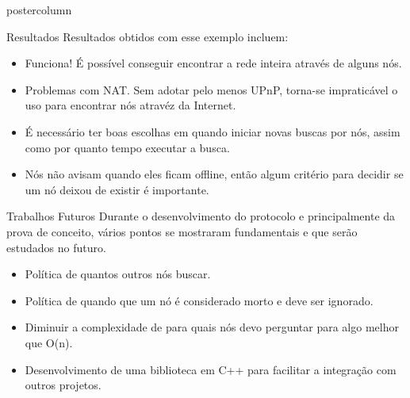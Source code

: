 \documentclass[final]{beamer}
\begin{document}
\begin{frame}
\begin{columns}
\begin{column}{.5\textwidth}
\begin{beamercolorbox}[center,wd=\textwidth]{postercolumn}
\begin{minipage}[T]{.95\textwidth}
{\begin{block}{Resultados}
                Resultados obtidos com esse exemplo incluem:
                \begin{itemize}
                  \item Funciona! É possível conseguir encontrar a rede inteira através de alguns nós.
                  \item Problemas com NAT. Sem adotar pelo menos UPnP, torna-se impraticável o uso para encontrar nós atravéz da Internet.
                  \item É necessário ter boas escolhas em quando iniciar novas buscas por nós, assim como por quanto tempo executar a busca.
                  \item Nós não avisam quando eles ficam offline, então algum critério para decidir se um nó deixou de existir é importante.
                \end{itemize}
                
                \vspace*{0.2cm}
            \end{block}
            
            \vspace*{0.2cm} 
            \begin{block}{Trabalhos Futuros}
                Durante o desenvolvimento do protocolo e principalmente da prova de conceito, vários pontos se mostraram fundamentais e que serão estudados no futuro.
                
                \begin{itemize}
                  \item Política de quantos outros nós buscar.
                  \item Política de quando que um nó é considerado morto e deve ser ignorado.
                  \item Diminuir a complexidade de para quais nós devo perguntar para algo melhor que O(n).
                  \item Desenvolvimento de uma biblioteca em C++ para facilitar a integração com outros projetos.
                \end{itemize}
                
                \vspace*{0.2cm} 
            \end{block}
            
}
\end{minipage}
\end{beamercolorbox}
\end{column}
\end{columns}
\end{frame}
\end{document}

